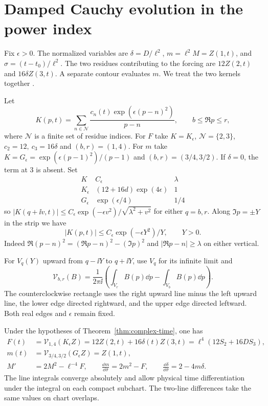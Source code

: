 \section{Damped Cauchy evolution in the power index}
\label{sec:cauchy}

Fix \(\epsilon>0\). The normalized variables are
\(\delta=D/\ell^2\), \(m=\ell^2M=Z(1,t)\), and
\(\sigma=(t-t_0)/\ell^2\). The two residues contributing to the
forcing are \(12Z(2,t)\) and \(16\delta Z(3,t)\). A separate
contour evaluates \(m\). We treat the two kernels together
\cite{BakerCM05,BakerCMReview}.

Let
\[
 K(p,t)=\sum_{n\in\mathcal N}\frac{c_n(t)\exp(\epsilon(p-n)^2)}{p-n},
 \qquad b\le \Re p\le r ,
\]
where \(\mathcal N\) is a finite set of residue indices. For
\(F\) take \(K=K_\epsilon\), \(\mathcal N=\{2,3\}\),
\(c_2=12,\ c_3=16\delta\) and \((b,r)=(1,4)\). For \(m\) take
\(K=G_\epsilon=\exp(\epsilon(p-1)^2)/(p-1)\) and
\((b,r)=(3/4,3/2)\). If \(\delta=0\), the term at \(3\) is
absent. Set
\[
 \begin{array}{c|c|c}
  K & C_\epsilon & \lambda\\ \hline
  K_\epsilon & (12+16d)\exp(4\epsilon) & 1\\
  G_\epsilon & \exp(\epsilon/4) & 1/4
 \end{array}
\]
so \(|K(q+\ii v,t)|\le C_\epsilon\exp(-\epsilon v^2)/
\sqrt{\lambda^2+v^2}\) for either \(q=b,r\).
Along \(\Im p=\pm Y\) in the strip we have
\begin{equation}
 |K(p,t)|\le C_\epsilon\exp(-\epsilon Y^2)/Y,\qquad Y>0 .
 \label{cau:kernel-bounds}
\end{equation}
Indeed \(\Re (p-n)^2=(\Re p-n)^2-(\Im p)^2\)
and \(|\Re p-n|\ge\lambda\) on either vertical.

For \(V_q(Y)\) upward from \(q-\ii Y\) to \(q+\ii Y\), use
\(V_q\) for its infinite limit and
\[
 \mathcal V_{b,r}(B)=\frac1{2\pi\ii}\left(
                      \int_{V_r} B(p)\dd p-\int_{V_b}B(p)\dd p\right).
\]
The counterclockwise rectangle uses the right upward line minus
the left upward line, the lower edge directed rightward,
and the upper edge directed leftward. Both real edges and
\(\epsilon\) remain fixed.

\begin{theorem}\label{thm:damped-cauchy}
Under the hypotheses of Theorem~\ref{thm:complex-time}, one has
\begin{equation}
 \begin{aligned}
 F(t)&=\mathcal V_{1,4}(K_\epsilon Z)
                  =12Z(2,t)+16\delta(t)Z(3,t)
                  =\ell^4(12S_2+16DS_3),\\
 m(t)&=\mathcal V_{3/4,3/2}(G_\epsilon Z)=Z(1,t),\\
 M'&=2M^2-\ell^{-4}F,\qquad
 \frac{\dd m}{\dd\sigma}=2m^2-F,\qquad
 \frac{\dd\delta}{\dd\sigma}=2-4m\delta .
 \end{aligned}
 \label{eq:forcing-contour}
\end{equation}
The line integrals converge absolutely and allow physical time
differentiation under the integral on each compact subchart. The
two-line differences take the same values on chart overlaps.
\end{theorem}

